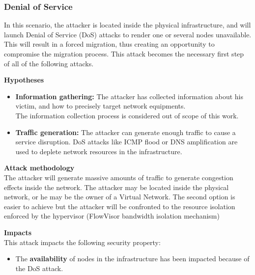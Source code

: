\subsubsection{Denial of Service}
In this scenario, the attacker is located inside the physical infrastructure, and will launch Denial of Service (DoS) attacks to render one or several nodes unavailable.
This will result in a forced migration, thus creating an opportunity to compromise the migration process.
This attack becomes the necessary first step of all of the following attacks.

\textbf{Hypotheses}
\begin{itemize}
    \item \textbf{Information gathering:} The attacker has collected information about his victim, and how to precisely target network equipments.\\
The information collection process is considered out of scope of this work.
    \item \textbf{Traffic generation:} The attacker can generate enough traffic to cause a service disruption.
DoS attacks like ICMP flood or DNS amplification are used to deplete network resources in the infrastructure.
\end{itemize}

\textbf{Attack methodology}\textbf{\\}
The attacker will generate massive amounts of traffic to generate congestion effects inside the network. The attacker may be located inside the physical network, or he may be the owner of a Virtual Network. The second option is easier to achieve but the attacker will be confronted to the resource isolation enforced by the hypervisor (\ie FlowVisor bandwidth isolation mechanism)


\textbf{Impacts}\textbf{\\}
This attack impacts the following security property:
\begin{itemize}
    \item The \textbf{availability} of nodes in the infrastructure has been impacted because of the DoS attack.
\end{itemize}



